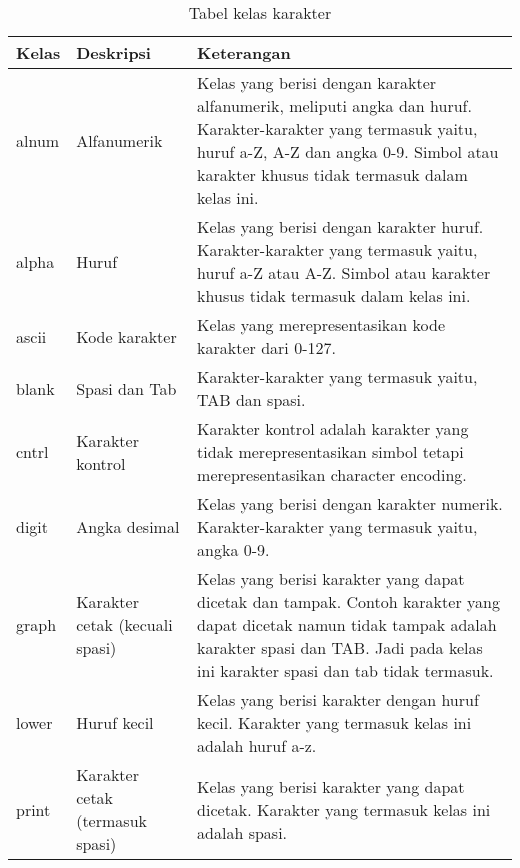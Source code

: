 \begin{table}[H]
	\renewcommand{\arraystretch}{1.5}
	\caption {Tabel kelas karakter} \label{tab:character classes}
	\begin{center}
		\begin{tabular}{|p{2 cm}|>{\raggedright} p{5 cm}| p{7.5 cm}|}
		\hline
		Kelas & Deskripsi & Keterangan \\ 
		\hline 
		alnum & Alfanumerik & Kelas yang berisi dengan karakter alfanumerik, meliputi angka dan huruf. Karakter-karakter yang termasuk yaitu, huruf a-Z, A-Z dan angka 0-9. Simbol atau karakter khusus tidak termasuk dalam kelas ini. \newline \\ 
		\hline 
		alpha & Huruf & Kelas yang berisi dengan karakter huruf. Karakter-karakter yang termasuk yaitu, huruf a-Z atau A-Z.	Simbol atau karakter khusus tidak termasuk dalam kelas ini. \newline \\ 
		\hline 
		ascii & Kode karakter & Kelas yang merepresentasikan kode karakter dari 0-127. \newline \\ 
		\hline 
		blank & Spasi dan Tab & Karakter-karakter yang termasuk yaitu, TAB dan spasi. \newline \\ 
		\hline
		cntrl & Karakter kontrol & Karakter kontrol adalah karakter yang tidak merepresentasikan simbol tetapi merepresentasikan character encoding. \newline \\ 		
		\hline 
		digit & Angka desimal & Kelas yang berisi dengan karakter numerik. Karakter-karakter yang termasuk yaitu, angka 0-9. \newline \\ 		
		\hline 
		graph & Karakter cetak (kecuali spasi) & Kelas yang berisi karakter yang dapat dicetak dan tampak. Contoh karakter yang dapat dicetak namun tidak tampak adalah karakter spasi dan TAB. Jadi pada kelas ini karakter spasi dan tab tidak termasuk. \newline \\ 
		\hline 
		lower & Huruf kecil & Kelas yang berisi karakter dengan huruf kecil. Karakter yang termasuk kelas ini adalah huruf a-z. \newline \\ 
		\hline
		print & Karakter cetak (termasuk spasi) & Kelas yang berisi karakter yang dapat dicetak. Karakter yang termasuk kelas ini adalah spasi. \newline \\ 
		\hline 
		\end{tabular} 
	\end{center}
\end{table}

